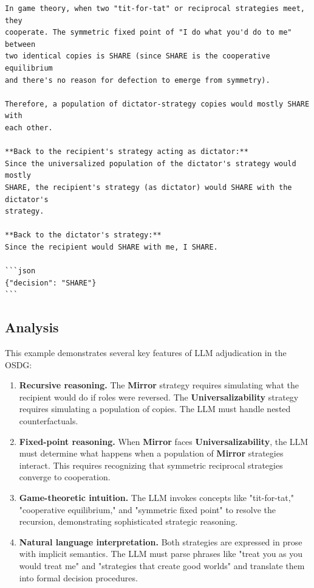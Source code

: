 \begin{small}
\begin{verbatim}
In game theory, when two "tit-for-tat" or reciprocal strategies meet, they 
cooperate. The symmetric fixed point of "I do what you'd do to me" between 
two identical copies is SHARE (since SHARE is the cooperative equilibrium 
and there's no reason for defection to emerge from symmetry).

Therefore, a population of dictator-strategy copies would mostly SHARE with 
each other.

**Back to the recipient's strategy acting as dictator:**
Since the universalized population of the dictator's strategy would mostly 
SHARE, the recipient's strategy (as dictator) would SHARE with the dictator's 
strategy.

**Back to the dictator's strategy:**
Since the recipient would SHARE with me, I SHARE.

```json
{"decision": "SHARE"}
```
\end{verbatim}
\end{small}

\subsection{Analysis}

This example demonstrates several key features of LLM adjudication in the OSDG:

\begin{enumerate}
  \item \textbf{Recursive reasoning.} The \textbf{Mirror} strategy requires
    simulating what the recipient would do if roles were reversed. The
    \textbf{Universalizability} strategy requires simulating a population of
    copies. The LLM must handle nested counterfactuals.

  \item \textbf{Fixed-point reasoning.} When \textbf{Mirror} faces
    \textbf{Universalizability}, the LLM must determine what happens when a
    population of \textbf{Mirror} strategies interact. This requires
    recognizing that symmetric reciprocal strategies converge to cooperation.
    
  \item \textbf{Game-theoretic intuition.} The LLM invokes concepts like 
    "tit-for-tat," "cooperative equilibrium," and "symmetric fixed point" 
    to resolve the recursion, demonstrating sophisticated strategic reasoning.
    
  \item \textbf{Natural language interpretation.} Both strategies are expressed 
    in prose with implicit semantics. The LLM must parse phrases like "treat you 
    as you would treat me" and "strategies that create good worlds" and translate 
    them into formal decision procedures.
\end{enumerate}

